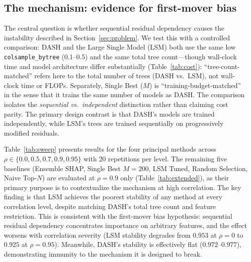 \documentclass[11pt]{article}
\newcommand{\dash}{\textsc{DASH}}
\newcommand{\rhovar}{\rho}
\begin{document}
\subsection{The mechanism: evidence for first-mover bias}
\label{sec:mechanism_result}

The central question is whether sequential residual dependency causes
the instability described in Section~\ref{sec:problem}. We test this
with a controlled comparison: \dash{} and the Large Single Model (LSM)
both use the same low \texttt{colsample\_bytree} (0.1--0.5) and the same
total tree count---though wall-clock time and model architecture differ
substantially (Table~\ref{tab:cost}): ``tree-count-matched'' refers here to
the total number of trees (DASH vs.\ LSM), not wall-clock time or FLOPs.
Separately, Single Best ($M$) is ``training-budget-matched'' in the sense
that it trains the same number of models as DASH. The comparison isolates the
\emph{sequential vs.\ independent} distinction rather than claiming
cost parity. The primary design contrast is that \dash{}'s models
are trained independently, while LSM's trees are trained sequentially
on progressively modified residuals.

Table~\ref{tab:sweep} presents results for the four principal methods
across $\rhovar \in \{0.0, 0.5, 0.7, 0.9, 0.95\}$ with 20 repetitions per
level. The remaining five baselines (Ensemble SHAP, Single Best $M{=}200$,
LSM Tuned, Random Selection, Naive Top-$N$) are evaluated at
$\rhovar = 0.9$ only (Table~\ref{tab:extended}), as their primary
purpose is to contextualize the mechanism at high correlation. The key finding is that LSM achieves the poorest
stability of any method at every correlation level, despite matching
\dash{}'s total tree count and feature restriction. This is consistent
with the first-mover bias hypothesis: sequential residual dependency concentrates
importance on arbitrary features, and the effect worsens with
correlation severity (LSM stability degrades from $0.953$ at
$\rhovar = 0$ to $0.925$ at $\rhovar = 0.95$). Meanwhile, \dash{}'s
stability is effectively flat ($0.972$--$0.977$), demonstrating
immunity to the mechanism it is designed to break.
\end{document}
